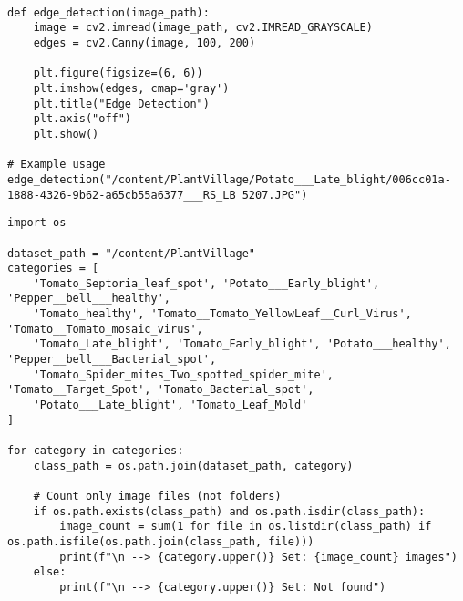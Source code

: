 \documentclass{article}
\begin{document}
\begin{lstlisting}

def edge_detection(image_path):
    image = cv2.imread(image_path, cv2.IMREAD_GRAYSCALE)
    edges = cv2.Canny(image, 100, 200)

    plt.figure(figsize=(6, 6))
    plt.imshow(edges, cmap='gray')
    plt.title("Edge Detection")
    plt.axis("off")
    plt.show()

# Example usage
edge_detection("/content/PlantVillage/Potato___Late_blight/006cc01a-1888-4326-9b62-a65cb55a6377___RS_LB 5207.JPG")
\end{lstlisting}
\begin{lstlisting}
import os

dataset_path = "/content/PlantVillage"
categories = [
    'Tomato_Septoria_leaf_spot', 'Potato___Early_blight', 'Pepper__bell___healthy',
    'Tomato_healthy', 'Tomato__Tomato_YellowLeaf__Curl_Virus', 'Tomato__Tomato_mosaic_virus',
    'Tomato_Late_blight', 'Tomato_Early_blight', 'Potato___healthy', 'Pepper__bell___Bacterial_spot',
    'Tomato_Spider_mites_Two_spotted_spider_mite', 'Tomato__Target_Spot', 'Tomato_Bacterial_spot',
    'Potato___Late_blight', 'Tomato_Leaf_Mold'
]

for category in categories:
    class_path = os.path.join(dataset_path, category)

    # Count only image files (not folders)
    if os.path.exists(class_path) and os.path.isdir(class_path):
        image_count = sum(1 for file in os.listdir(class_path) if os.path.isfile(os.path.join(class_path, file)))
        print(f"\n --> {category.upper()} Set: {image_count} images")
    else:
        print(f"\n --> {category.upper()} Set: Not found")

\end{lstlisting}
\end{document}
